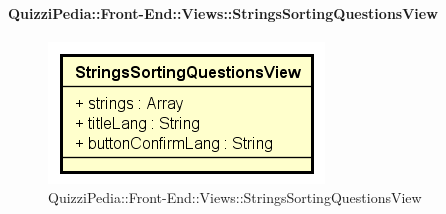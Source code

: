 \paragraph{QuizziPedia::Front-End::Views::StringsSortingQuestionsView}
\begin{figure} [ht]
	\centering
	\includegraphics[scale=0.45]{UML/Classi/Front-End/QuizziPedia_Front-end_Views_StringsSortingQuestionsView.png}
	\caption{QuizziPedia::Front-End::Views::StringsSortingQuestionsView}
\end{figure} \FloatBarrier
